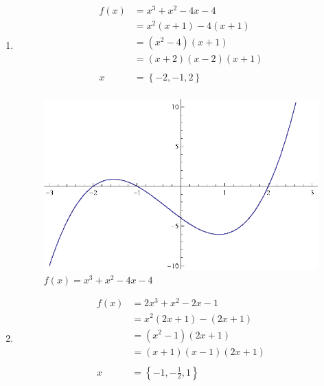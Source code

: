 \documentclass{article}
\begin{document}
\begin{enumerate}
  \item 
    \begin{align*}
      f(x) &= x^3 + x^2 - 4x - 4 \\
           &= x^2(x + 1) - 4(x + 1) \\
           &= (x^2 - 4)(x + 1) \\
           &= (x + 2)(x - 2)(x + 1) \\
      \\
      x    &= \left\{ -2, -1, 2 \right\} \\
    \end{align*}
    
    \begin{figure}[H]
      \centering
      \includegraphics[scale=0.9]{graph6.eps}
      \caption*{$f(x) = x^3 + x^2 - 4x - 4$}
    \end{figure}

  \item 
    \begin{align*}
      f(x) &= 2x^3 + x^2 - 2x - 1  \\
           &= x^2(2x + 1) - (2x + 1) \\
           &= (x^2 - 1)(2x + 1) \\
           &= (x + 1)(x - 1)(2x + 1) \\
      \\
      x    &= \left\{ -1, - \frac{1}{2}, 1 \right\}
    \end{align*}
    

\end{enumerate}
\end{document}
